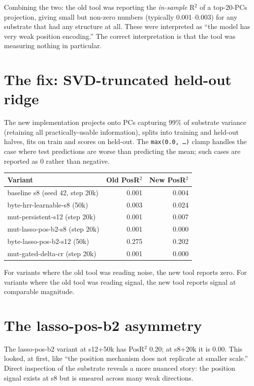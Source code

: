 \documentclass[11pt,openany]{book}
\begin{document}
Combining the two: the old tool was reporting the \emph{in-sample}
R$^2$ of a top-20-PCs projection, giving small but non-zero numbers
(typically 0.001--0.003) for any substrate that had any structure at
all. These were interpreted as ``the model has very weak position
encoding.'' The correct interpretation is that the tool was measuring
nothing in particular.

\section{The fix: SVD-truncated held-out ridge}

The new implementation projects onto PCs capturing 99\% of substrate
variance (retaining all practically-usable information), splits into
training and held-out halves, fits on train and scores on held-out.
The \texttt{max(0.0, \ldots)} clamp handles the case where test
predictions are worse than predicting the mean; such cases are
reported as 0 rather than negative.

\begin{longtable}{lrr}
\toprule
Variant & Old PosR$^2$ & New PosR$^2$ \\
\midrule
baseline s8 (seed 42, step 20k) & 0.001 & 0.004 \\
byte-hrr-learnable-s8 (50k) & 0.003 & 0.024 \\
mut-persistent-s12 (step 20k) & 0.001 & 0.007 \\
mut-lasso-pos-b2-s8 (step 20k) & 0.001 & 0.000 \\
byte-lasso-pos-b2-s12 (50k) & 0.275 & 0.202 \\
mut-gated-delta-cr (step 20k) & 0.001 & 0.000 \\
\bottomrule
\end{longtable}

For variants where the old tool was reading noise, the new tool
reports zero. For variants where the old tool was reading signal, the
new tool reports signal at comparable magnitude.

\section{The lasso-pos-b2 asymmetry}

The lasso-pos-b2 variant at s12+50k has PosR$^2$ 0.20; at s8+20k it
is 0.00. This looked, at first, like ``the position mechanism does
not replicate at smaller scale.'' Direct inspection of the substrate
reveals a more nuanced story: the position signal exists at s8 but
is smeared across many weak directions.
\end{document}
